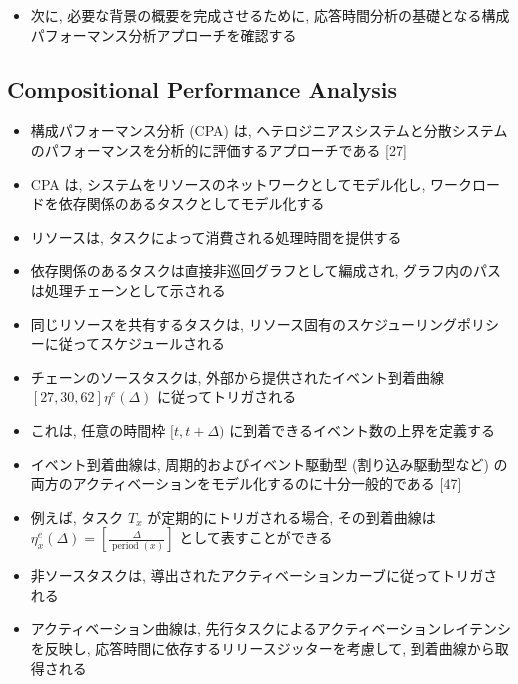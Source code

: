 \begin{frame}{}
    \begin{itemize}
        \item 次に, 必要な背景の概要を完成させるために, 応答時間分析の基礎となる構成パフォーマンス分析アプローチを確認する
    \end{itemize}
\end{frame}


\subsection{Compositional Performance Analysis}
\label{ssec: compositional performance analysis}

\begin{frame}{}
    \begin{itemize}
        \item 構成パフォーマンス分析 (CPA) は, ヘテロジニアスシステムと分散システムのパフォーマンスを分析的に評価するアプローチである [27]
        \item CPA は, システムをリソースのネットワークとしてモデル化し, ワークロードを依存関係のあるタスクとしてモデル化する
        \item リソースは, タスクによって消費される処理時間を提供する
    \end{itemize}
\end{frame}

\begin{frame}{}
    \begin{itemize}
        \item 依存関係のあるタスクは直接非巡回グラフとして編成され, グラフ内のパスは処理チェーンとして示される
        \item 同じリソースを共有するタスクは, リソース固有のスケジューリングポリシーに従ってスケジュールされる
        \item チェーンのソースタスクは, 外部から提供されたイベント到着曲線 $[27,30,62] \eta^{e}(\Delta)$ に従ってトリガされる
        \item これは, 任意の時間枠 $[t, t+\Delta)$ に到着できるイベント数の上界を定義する
    \end{itemize}
\end{frame}

\begin{frame}{}
    \begin{itemize}
        \item イベント到着曲線は, 周期的およびイベント駆動型 (割り込み駆動型など) の両方のアクティベーションをモデル化するのに十分一般的である [47]
        \item 例えば, タスク $T_{x}$ が定期的にトリガされる場合, その到着曲線は $\eta_{x}^{e}(\Delta)=\left[\frac{\Delta}{\operatorname{period}(x)}\right]$ として表すことができる
        \item 非ソースタスクは, 導出されたアクティベーションカーブに従ってトリガされる
        \item アクティベーション曲線は, 先行タスクによるアクティベーションレイテンシを反映し, 応答時間に依存するリリースジッターを考慮して, 到着曲線から取得される
    \end{itemize}
\end{frame}

